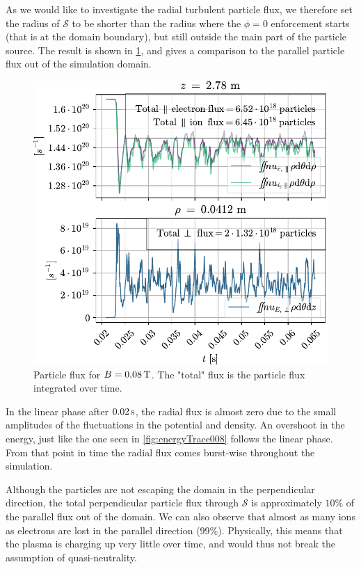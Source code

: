 As we would like to investigate the radial turbulent particle flux, we therefore set the radius of $\mathcal{S}$ to be shorter than the radius where the $\phi=0$ enforcement starts (that is at the domain boundary), but still outside the main part of the particle source.
The result is shown in \cref{fig:flux008}, and gives a comparison to the parallel particle flux out of the simulation domain.
%
\begin{figure}[htb]
    \centering
    \includegraphics{fig/results/totalFlux/flux008}
    \caption{Particle flux for $B=0.08\, \text{T}$.
        The "total" flux is the particle flux integrated over time.}
    \label{fig:flux008}
\end{figure}
%
In the linear phase after $0.02\, \text{s}$, the radial flux is almost zero due to the small amplitudes of the fluctuations in the potential and density.
An overshoot in the energy, just like the one seen in \cref{fig:energyTrace008} follows the linear phase.
From that point in time the radial flux comes burst-wise throughout the simulation.

Although the particles are not escaping the domain in the perpendicular direction, the total perpendicular particle flux through $\mathcal{S}$
is approximately $10\%$ of the parallel flux out of the domain.
We can also observe that almost as many ions as electrons are lost in the parallel direction ($99\%$).
Physically, this means that the plasma is charging up very little over time, and would thus not break the assumption of quasi-neutrality.
